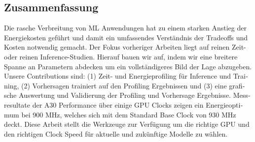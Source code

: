 \newpage


\begin{otherlanguage}{ngerman}
\chapter*{Zusammenfassung}



Die rasche Verbreitung von ML Anwendungen hat zu einem starken Anstieg der Energiekosten geführt und damit ein umfassendes Verständnis der 
Tradeoffs und Kosten notwendig gemacht. Der Fokus vorheriger Arbeiten liegt auf reinen Zeit- oder reinen Inference-Studien. Hierauf bauen wir auf, indem wir eine breitere Spanne an Parametern abdecken um ein vollständigeres Bild der Lage abzugeben. Unsere Contributions sind: (1) Zeit- und Energieprofiling für Inference und Training, (2) Vorhersagen trainiert auf den Profiling Ergebnissen und (3) eine grafische Auswertung und Validierung der Profiling und Vorhersage Ergebnisse. Messresultate der A30 Performance über einige GPU Clocks zeigen ein Energieoptimum bei 900 MHz, welches sich mit dem Standard Base Clock von 930 MHz deckt. Diese Arbeit stellt die Werkzeuge zur Verfügung um die richtige GPU und den richtigen Clock Speed für aktuelle und zukünftige Modelle zu wählen.
\end{otherlanguage}

\endgroup

\vfill
